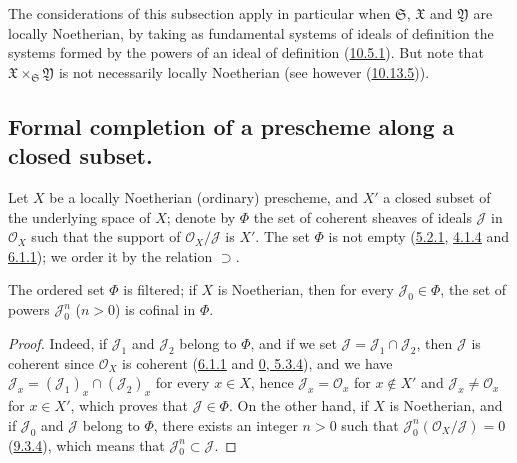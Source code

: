 \begin{env}[10.7.4]
The considerations of this subsection apply in particular when
$\mathfrak{S}$, $\mathfrak{X}$ and $\mathfrak{Y}$ are locally
Noetherian, by taking as fundamental systems of ideals of definition
the systems formed by the powers of an ideal of definition
(\hyperref[I.10.5.1]{10.5.1}). But note that
$\mathfrak{X}\times_{\mathfrak{S}}\mathfrak{Y}$ is not necessarily
locally Noetherian (see however
(\hyperref[I.10.13.5]{10.13.5})).
\end{env}


\subsection{Formal completion of a prescheme along a closed subset.}
\label{subsection:I.10.8}

\begin{env}[10.8.1]
\label{I.10.8.1}
Let $X$ be a locally Noetherian (ordinary) prescheme, and $X'$ a closed
subset of the underlying space of $X$; denote by $\Phi$ the set of
coherent sheaves of ideals $\mathscr{J}$ in $\mathscr{O}_X$ such that
the support of $\mathscr{O}_X/\mathscr{J}$ is $X'$. The set $\Phi$
is not empty (\hyperref[I.5.2.1]{5.2.1},
\hyperref[I.4.1.4]{4.1.4} and
\hyperref[I.6.1.1]{6.1.1}); we order it by the relation
$\supset$.
\end{env}

\begin{lemma}[10.8.2]
\label{I.10.8.2}
The ordered set $\Phi$ is filtered; if $X$ is Noetherian, then for every
$\mathscr{J}_0\in\Phi$, the set of powers
$\mathscr{J}_0^n$ ($n>0$) is cofinal in $\Phi$.
\end{lemma}

\begin{proof}
Indeed, if $\mathscr{J}_1$ and $\mathscr{J}_2$ belong to $\Phi$, and
if we set $\mathscr{J}=\mathscr{J}_1\cap\mathscr{J}_2$, then
$\mathscr{J}$ is coherent since $\mathscr{O}_X$ is coherent
(\hyperref[I.6.1.1]{6.1.1} and
\hyperref[0.5.3.4]{0, 5.3.4}), and we have
$\mathscr{J}_x=(\mathscr{J}_1)_x\cap(\mathscr{J}_2)_x$ for every
$x\in X$, hence $\mathscr{J}_x=\mathscr{O}_x$ for $x\notin X'$ and
$\mathscr{J}_x\neq\mathscr{O}_x$ for $x\in X'$, which proves that
$\mathscr{J}\in\Phi$. On the other hand, if $X$ is Noetherian, and if
$\mathscr{J}_0$ and $\mathscr{J}$ belong to $\Phi$, there exists an
integer $n>0$ such that
$\mathscr{J}_0^n(\mathscr{O}_X/\mathscr{J})=0$
(\hyperref[I.9.3.4]{9.3.4}), which means that
$\mathscr{J}_0^n\subset\mathscr{J}$.
\end{proof}

